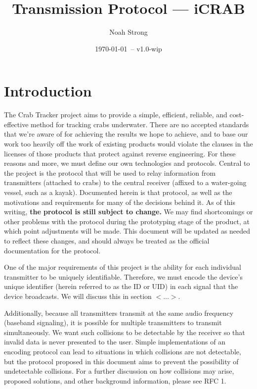 \documentclass[12pt]{article}
\title{Transmission Protocol --- iCRAB}
\author{
	Noah Strong
}
\date{\today\ -- v1.0-wip}
\begin{document}
\maketitle


\section{Introduction} \label{introduction}

The Crab Tracker project aims to provide a simple, efficient, reliable, and
cost-effective method for tracking crabs underwater. There are no accepted
standards that we're aware of for achieving the results we hope to achieve,
and to base our work too heavily off the work of existing products would
violate the clauses in the licenses of those products that protect against
reverse engineering.
For these reasons and more, we must define our own technologies and protocols.
Central to the project is the protocol that will be used to relay information
from transmitters (attached to crabs) to the central receiver (affixed to a
water-going vessel, such as a kayak).
Documented herein is that protocol, as well as the motivations and requirements
for many of the decisions behind it.
As of this writing, {\bf the protocol is still subject to change.}
We may find shortcomings or other problems with the protocol during
the prototyping stage of the product, at which point adjustments will be made.
This document will be updated as needed to reflect these changes,
and should always be treated as the official documentation for the protocol.

One of the major requirements of this project is the ability for each
individual transmitter to be uniquely identifiable. Therefore, we must encode
the device's unique identifier (herein referred to as the ID or UID) in each
signal that the device broadcasts.
We will discuss this in section $<\dots>$.%

Additionally, because all transmitters transmit at the same audio frequency
(baseband signaling), it is possible for multiple transmitters to transmit
simultaneously. We want such collisions to be detectable by the receiver
so that invalid data is never presented to the user. Simple implementations
of an encoding protocol can lead to situations in which collisions are not
detectable, but the protocol proposed in this document aims to prevent the
possibility of undetectable collisions. For a further discussion on how
collisions may arise, proposed solutions, and other background information,
please see RFC 1.
\end{document}
